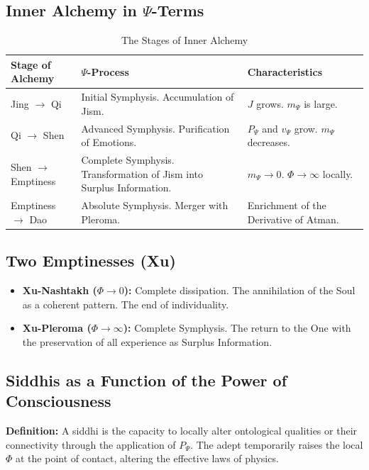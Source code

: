 \documentclass[a4paper,12pt]{article}
\begin{document}
	\subsection{Inner Alchemy in $\Psi$-Terms}
	
	\begin{table}[H]
		\centering
		\begin{tabular}{|p{3.5cm}|p{5.5cm}|p{5cm}|}
			\hline
			\textbf{Stage of Alchemy} & \textbf{$\Psi$-Process} & \textbf{Characteristics} \\
			\hline
			Jing $\to$ Qi & Initial Symphysis. Accumulation of Jism. & $J$ grows. $m_{\Psi}$ is large. \\
			\hline
			Qi $\to$ Shen & Advanced Symphysis. Purification of Emotions. & $P_{\Psi}$ and $v_{\Psi}$ grow. $m_{\Psi}$ decreases. \\
			\hline
			Shen $\to$ Emptiness & Complete Symphysis. Transformation of Jism into Surplus Information. & $m_{\Psi} \to 0$. $\Phi \to \infty$ locally. \\
			\hline
			Emptiness $\to$ Dao & Absolute Symphysis. Merger with Pleroma. & Enrichment of the Derivative of Atman. \\
			\hline
		\end{tabular}
		\caption{The Stages of Inner Alchemy}
	\end{table}
	
	\subsection{Two Emptinesses (Xu)}
	
	\begin{itemize}
		\item \textbf{Xu-Nashtakh ($\Phi \to 0$):} Complete dissipation. The annihilation of the Soul as a coherent pattern. The end of individuality.
		\item \textbf{Xu-Pleroma ($\Phi \to \infty$):} Complete Symphysis. The return to the One with the preservation of all experience as Surplus Information.
	\end{itemize}
	
	\subsection{Siddhis as a Function of the Power of Consciousness}
	
	\textbf{Definition:} A siddhi is the capacity to locally alter ontological qualities or their connectivity through the application of $P_{\Psi}$. The adept temporarily raises the local $\Phi$ at the point of contact, altering the effective laws of physics.
	
\end{document}
